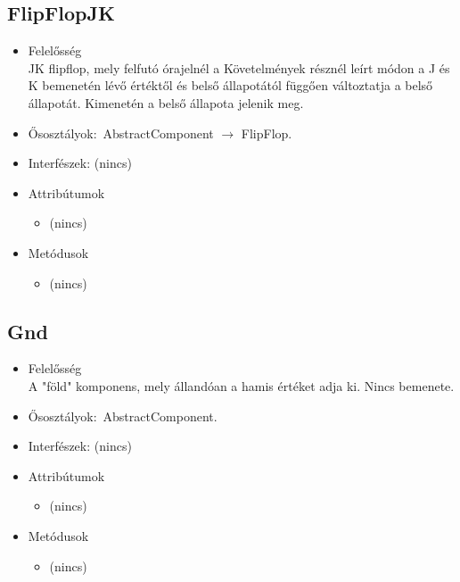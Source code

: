 \subsection{FlipFlopJK}
\begin{itemize}
\item Felelősség\\
JK flipflop, mely felfutó órajelnél a Követelmények résznél leírt módon a J és K bemenetén lévő értéktől és belső állapotától függően változtatja a belső állapotát. Kimenetén a belső állapota jelenik meg.
\item Ősosztályok:\ AbstractComponent $\rightarrow{}$ FlipFlop.
\item Interfészek: (nincs)
\item Attribútumok $\ $
\begin{itemize}
\item (nincs)
\end{itemize}
\item Metódusok$\ $
\begin{itemize}
\item (nincs)
\end{itemize}
\end{itemize}

\subsection{Gnd}
\begin{itemize}
\item Felelősség\\
A "föld" komponens, mely állandóan a hamis értéket adja ki. Nincs bemenete.
\item Ősosztályok:\ AbstractComponent.
\item Interfészek: (nincs)
\item Attribútumok $\ $
\begin{itemize}
\item (nincs)
\end{itemize}
\item Metódusok$\ $
\begin{itemize}
\item (nincs)
\end{itemize}
\end{itemize}

